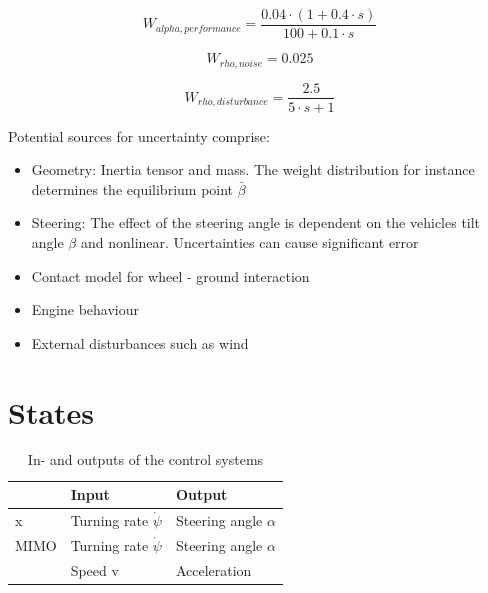 \documentclass[conference]{IEEEtran}
\begin{document}
\begin{equation}
{W_{alpha,performance}} = \frac{{0.04 \cdot \left( {1 + 0.4 \cdot s} \right)}}{{100 + 0.1 \cdot s}}
\end{equation}

\begin{equation}
{W_{rho,noise}} = 0.025
\end{equation}

\begin{equation}
{W_{rho,disturbance}} = \frac{{2.5}}{{5 \cdot s + 1}}
\end{equation}



Potential sources for uncertainty comprise:

\begin{itemize}
    \item Geometry: Inertia tensor and mass. The weight distribution for instance determines the equilibrium point $\bar{\beta}$
    \item Steering: The effect of the steering angle is dependent on the vehicles tilt angle $\beta$ and nonlinear. Uncertainties can cause significant error
    \item Contact model for wheel - ground interaction
    \item Engine behaviour
    \item External disturbances such as wind
\end{itemize}


 

\section{States}

\begin{table}[h]
\begin{center}
\begin{tabular}{|l||l|l|}
\hline
 		& Input 		& Output\\
\hline
x 	& Turning rate $\dot{\psi}$ 	& Steering angle $\alpha$\\
\hline
MIMO 	& Turning rate $\dot{\psi}$ 	& Steering angle $\alpha$\\
     	& Speed v 		& Acceleration\\
\hline
\end{tabular}
\caption{In- and outputs of the control systems}  
\label{figure:controlinout}
\end{center}
\end{table}
\end{document}
